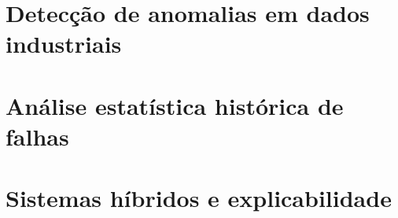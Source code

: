 \section{Detecção de anomalias em dados industriais}
\label{sec:anomalias}



\section{Análise estatística histórica de falhas}
\label{sec:estatistica_historica}



\section{Sistemas híbridos e explicabilidade}
\label{sec:hibridos_xai}


